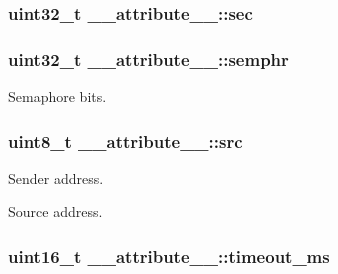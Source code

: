 \subsubsection[{\texorpdfstring{sec}{sec}}]{\setlength{\rightskip}{0pt plus 5cm}uint32\+\_\+t \+\_\+\+\_\+attribute\+\_\+\+\_\+\+::sec}\hypertarget{struct____attribute_____a84c6baaec3dc2429942a79d7de07b939}{}\label{struct____attribute_____a84c6baaec3dc2429942a79d7de07b939}
\subsubsection[{\texorpdfstring{semphr}{semphr}}]{\setlength{\rightskip}{0pt plus 5cm}uint32\+\_\+t \+\_\+\+\_\+attribute\+\_\+\+\_\+\+::semphr}\hypertarget{struct____attribute_____a093c08572a86d14158d4ad2b8d526557}{}\label{struct____attribute_____a093c08572a86d14158d4ad2b8d526557}


Semaphore bits. 

\subsubsection[{\texorpdfstring{src}{src}}]{\setlength{\rightskip}{0pt plus 5cm}uint8\+\_\+t \+\_\+\+\_\+attribute\+\_\+\+\_\+\+::src}\hypertarget{struct____attribute_____a3269a81ad93d0affbeabf284e63829aa}{}\label{struct____attribute_____a3269a81ad93d0affbeabf284e63829aa}


Sender address. 

Source address. 
\subsubsection[{\texorpdfstring{timeout\+\_\+ms}{timeout_ms}}]{\setlength{\rightskip}{0pt plus 5cm}uint16\+\_\+t \+\_\+\+\_\+attribute\+\_\+\+\_\+\+::timeout\+\_\+ms}\hypertarget{struct____attribute_____a9f3aa35286aea8d6a20a5358b3730361}{}\label{struct____attribute_____a9f3aa35286aea8d6a20a5358b3730361}


